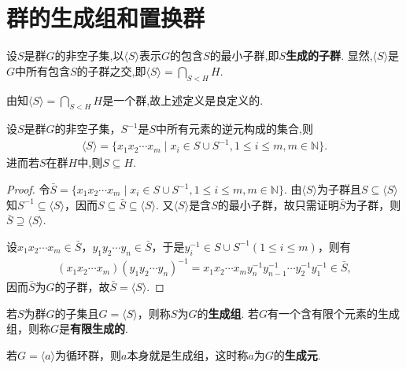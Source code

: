 \documentclass[../../main.tex]{subfiles}%
\begin{document}
\section{群的生成组和置换群}

\begin{definition}
设$S$是群$G$的非空子集,以$\langle S\rangle$表示$G$的包含$S$的最小子群,即$S$\textbf{生成的子群}.
显然,$\langle S\rangle$是$G$中所有包含$S$的子群之交,即$\langle S\rangle=\bigcap_{S<H}{H}.$
\end{definition}
\begin{note}
由知$\langle S\rangle=\bigcap_{S<H}{H}$是一个群,故上述定义是良定义的.
\end{note}

\begin{theorem}\label{theorem:生成子群的元素的形式}
设$S$是群$G$的非空子集，$S^{-1}$是$S$中所有元素的逆元构成的集合,则
\begin{align*}
\langle S\rangle = \{x_1x_2\cdots x_m \mid x_i \in S \cup S^{-1}, 1 \leqslant i \leqslant m, m \in \mathbb{N}\}.
\end{align*}
进而若$S$在群$H$中,则$S\subseteq H$.
\end{theorem}
\begin{proof}

令$\bar{S} = \{x_1x_2\cdots x_m \mid x_i \in S \cup S^{-1}, 1 \leqslant i \leqslant m, m \in \mathbb{N}\}$. 由$\langle S\rangle$为子群且$S \subseteq \langle S\rangle$知$S^{-1} \subseteq \langle S\rangle$，因而$S \subseteq \bar{S} \subseteq \langle S\rangle$. 又$\langle S\rangle$是含$S$的最小子群，故只需证明$\bar{S}$为子群，则$\bar{S} \supseteq \langle S\rangle$.

设$x_1x_2\cdots x_m \in \bar{S}$，$y_1y_2\cdots y_n \in \bar{S}$，于是$y_i^{-1} \in S \cup S^{-1}(1 \leqslant i \leqslant m)$，则有
\begin{align*}
(x_1x_2\cdots x_m)(y_1y_2\cdots y_n)^{-1} = x_1x_2\cdots x_m y_n^{-1} y_{n-1}^{-1} \cdots y_2^{-1} y_1^{-1} \in \bar{S},
\end{align*}
因而$\bar{S}$为$G$的子群，故$\bar{S} = \langle S\rangle$.

\end{proof}

\begin{definition}
若$S$为群$G$的子集且$G = \langle S\rangle$，则称$S$为$G$的\textbf{生成组}. 若$G$有一个含有限个元素的生成组，则称$G$是\textbf{有限生成的}.

若$G = \langle a\rangle$为循环群，则$a$本身就是生成组，这时称$a$为$G$的\textbf{生成元}.
\end{definition}
\end{document}
